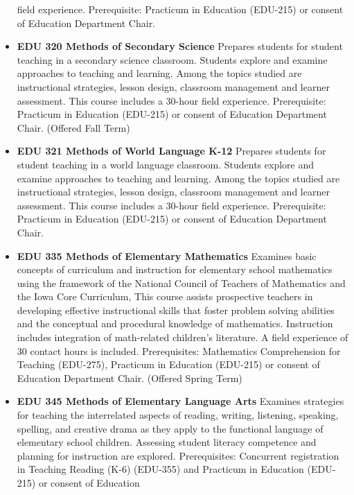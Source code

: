 \documentclass[
  letterpaper,
]{scrbook}
\begin{document}
\begin{itemize}
  field experience. Prerequisite: Practicum in Education (EDU-215) or
  consent of Education Department Chair.\\
\item
  \textbf{EDU 320 Methods of Secondary Science} Prepares students for
  student teaching in a secondary science classroom. Students explore
  and examine approaches to teaching and learning. Among the topics
  studied are instructional strategies, lesson design, classroom
  management and learner assessment. This course includes a 30-hour
  field experience. Prerequisite: Practicum in Education (EDU-215) or
  consent of Education Department Chair. (Offered Fall Term)\\
\item
  \textbf{EDU 321 Methods of World Language K-12} Prepares students for
  student teaching in a world language classroom. Students explore and
  examine approaches to teaching and learning. Among the topics studied
  are instructional strategies, lesson design, classroom management and
  learner assessment. This course includes a 30-hour field experience.
  Prerequisite: Practicum in Education (EDU-215) or consent of Education
  Department Chair.\\
\item
  \textbf{EDU 335 Methods of Elementary Mathematics} Examines basic
  concepts of curriculum and instruction for elementary school
  mathematics using the framework of the National Council of Teachers of
  Mathematics and the Iowa Core Curriculum, This course assists
  prospective teachers in developing effective instructional skills that
  foster problem solving abilities and the conceptual and procedural
  knowledge of mathematics. Instruction includes integration of
  math-related children's literature. A field experience of 30 contact
  hours is included. Prerequisites: Mathematics Comprehension for
  Teaching (EDU-275), Practicum in Education (EDU-215) or consent of
  Education Department Chair. (Offered Spring Term)\\
\item
  \textbf{EDU 345 Methods of Elementary Language Arts} Examines
  strategies for teaching the interrelated aspects of reading, writing,
  listening, speaking, spelling, and creative drama as they apply to the
  functional language of elementary school children. Assessing student
  literacy competence and planning for instruction are explored.
  Prerequisites: Concurrent registration in Teaching Reading (K-6)
  (EDU-355) and Practicum in Education (EDU-215) or consent of Education

\end{itemize}
\end{document}
